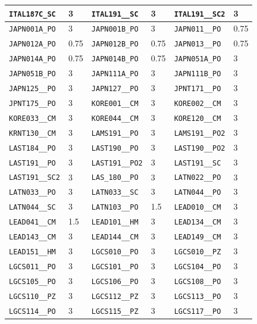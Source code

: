 \begin{longtable}{|l|l||l|l||l|l|}
    \verb|ITAL187C_SC| & 3 & \verb|ITAL191__SC| & 3 & \verb|ITAL191__SC2| & 3\\\hline
    \verb|JAPN001A_PO| & 3 & \verb|JAPN001B_PO| & 3 & \verb|JAPN011__PO| & 0.75\\\hline
    \verb|JAPN012A_PO| & 0.75 & \verb|JAPN012B_PO| & 0.75 & \verb|JAPN013__PO| & 0.75\\\hline
    \verb|JAPN014A_PO| & 0.75 & \verb|JAPN014B_PO| & 0.75 & \verb|JAPN051A_PO| & 3\\\hline
    \verb|JAPN051B_PO| & 3 & \verb|JAPN111A_PO| & 3 & \verb|JAPN111B_PO| & 3\\\hline
    \verb|JAPN125__PO| & 3 & \verb|JAPN127__PO| & 3 & \verb|JPNT171__PO| & 3\\\hline
    \verb|JPNT175__PO| & 3 & \verb|KORE001__CM| & 3 & \verb|KORE002__CM| & 3\\\hline
    \verb|KORE033__CM| & 3 & \verb|KORE044__CM| & 3 & \verb|KORE120__CM| & 3\\\hline
    \verb|KRNT130__CM| & 3 & \verb|LAMS191__PO| & 3 & \verb|LAMS191__PO2| & 3\\\hline
    \verb|LAST184__PO| & 3 & \verb|LAST190__PO| & 3 & \verb|LAST190__PO2| & 3\\\hline
    \verb|LAST191__PO| & 3 & \verb|LAST191__PO2| & 3 & \verb|LAST191__SC| & 3\\\hline
    \verb|LAST191__SC2| & 3 & \verb|LAS_180__PO| & 3 & \verb|LATN022__PO| & 3\\\hline
    \verb|LATN033__PO| & 3 & \verb|LATN033__SC| & 3 & \verb|LATN044__PO| & 3\\\hline
    \verb|LATN044__SC| & 3 & \verb|LATN103__PO| & 1.5 & \verb|LEAD010__CM| & 3\\\hline
    \verb|LEAD041__CM| & 1.5 & \verb|LEAD101__HM| & 3 & \verb|LEAD134__CM| & 3\\\hline
    \verb|LEAD143__CM| & 3 & \verb|LEAD144__CM| & 3 & \verb|LEAD149__CM| & 3\\\hline
    \verb|LEAD151__HM| & 3 & \verb|LGCS010__PO| & 3 & \verb|LGCS010__PZ| & 3\\\hline
    \verb|LGCS011__PO| & 3 & \verb|LGCS101__PO| & 3 & \verb|LGCS104__PO| & 3\\\hline
    \verb|LGCS105__PO| & 3 & \verb|LGCS106__PO| & 3 & \verb|LGCS108__PO| & 3\\\hline
    \verb|LGCS110__PZ| & 3 & \verb|LGCS112__PZ| & 3 & \verb|LGCS113__PO| & 3\\\hline
    \verb|LGCS114__PO| & 3 & \verb|LGCS115__PZ| & 3 & \verb|LGCS117__PO| & 3\\\hline

\end{longtable}
